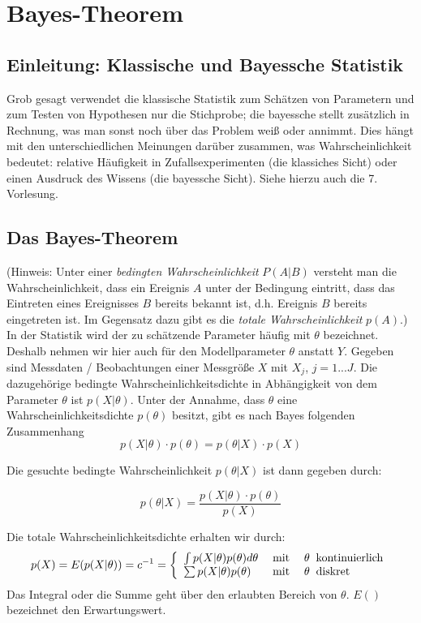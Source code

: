
\section{Bayes-Theorem}
\subsection{Einleitung: Klassische und Bayessche Statistik}
Grob gesagt verwendet die klassische Statistik zum Schätzen von Parametern
und zum Testen von Hypothesen nur die Stichprobe; die bayessche stellt zusätzlich in Rechnung, was man sonst noch über das Problem weiß oder 
annimmt. Dies hängt mit den unterschiedlichen Meinungen darüber zusammen,
was Wahrscheinlichkeit bedeutet: relative Häufigkeit in Zufallsexperimenten
(die klassiches Sicht) oder einen Ausdruck des Wissens (die bayessche Sicht). Siehe hierzu auch die 7. Vorlesung.

\subsection{Das Bayes-Theorem} 
(Hinweis: Unter einer \textit{bedingten Wahrscheinlichkeit} $P(A|B)$ versteht man die Wahrscheinlichkeit, dass ein Ereignis $A$ unter der Bedingung eintritt, dass das Eintreten eines Ereignisses $B$ bereits bekannt ist, d.h. Ereignis $B$ bereits eingetreten ist.
Im Gegensatz dazu gibt es die \textit{totale Wahrscheinlichkeit} $p(A)$.)\\ 
In der Statistik wird der zu schätzende Parameter häufig mit $\theta$ bezeichnet. Deshalb nehmen wir hier auch für 
den Modellparameter $\theta$ anstatt $Y$. 
Gegeben sind Messdaten / Beobachtungen einer Messgröße $X$ mit $X_j$, $j=1...J$. Die dazugehörige bedingte
Wahrscheinlichkeitsdichte in Abhängigkeit von dem Parameter $\theta$ ist $p(X|\theta)$. Unter der Annahme, dass $\theta$ eine Wahrscheinlichkeitsdichte 
$p(\theta)$ besitzt, gibt es nach Bayes folgenden Zusammenhang 
\begin{equation}
p(X|\theta)\cdot p(\theta) = p(\theta | X) \cdot p(X)
\end{equation}

Die gesuchte bedingte Wahrscheinlichkeit $p(\theta | X)$ ist dann 
gegeben durch:

\begin{equation}
p(\theta | X) = \frac{p(X|\theta)\cdot p(\theta)}{p(X)} 
\label{eq:BayesTheorem}
\end{equation}

Die totale Wahrscheinlichkeitsdichte erhalten wir durch:
\begin{equation}
p(X) = E(p(X|\theta)) = c^{-1} = \left\lbrace { 
	\begin{array}{l l l}
	\int p(X|\theta) p(\theta) d \theta &\;\mathrm{mit} \; & \theta \;\; \mathrm{kontinuierlich} \\
	\sum  p(X|\theta) p(\theta) &\;\mathrm{mit} \; & \theta \;\; \mathrm{diskret} \\
	\end{array}	
 } \right . 
\end{equation}
Das Integral oder die Summe geht über den erlaubten Bereich von $\theta$. $E()$ bezeichnet den Erwartungswert.


